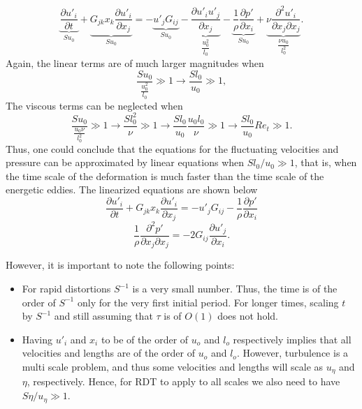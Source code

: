\documentclass[oneside,a4paper,11pt]{report}
\newcommand{\pfluc}{p'}
\newcommand{\ufluc}{u'}
\begin{document}
\begin{equation}
\underbrace{\frac{\partial \ufluc_i}{\partial t}}_{\displaystyle Su_0} + \underbrace{G_{jk} x_k \frac{\partial \ufluc_i}{\partial x_j}}_{ \displaystyle Su_0} = -\underbrace{\ufluc_j G_{ij}}_{\displaystyle S u_0} - \underbrace{\frac{\partial \ufluc_i \ufluc_j}{\partial x_j}}_{\dfrac{u_0^2}{l_0}} - \underbrace{\frac{1}{\rho} \frac{\partial \pfluc}{\partial x_i}}_{\displaystyle Su_0} + \underbrace{\nu \frac{\partial^2 \ufluc_i}{\partial x_j \partial x_j}}_{\dfrac{\nu u_0}{l_0^2}}. 
\end{equation}
Again, the linear terms are of much larger magnitudes when
\begin{equation}
\frac{Su_0}{\frac{u_0^2}{l_0}} \gg 1 \to \frac{Sl_0}{u_0} \gg 1,
\end{equation}
The viscous terms can be neglected when
\begin{equation}
\frac{Su_0}{\frac{u_0\nu}{l_0^2}} \gg 1 \to \frac{Sl_0^2}{\nu} \gg 1 \to \frac{Sl_0}{u_0}\frac{u_0l_0}{\nu} \gg 1 \to \frac{Sl_0}{u_0} Re_t \gg 1.
\end{equation}
Thus, one could conclude that the equations for the fluctuating velocities and pressure can be approximated by linear equations when $Sl_0/u_0 \gg 1$, that is, when the time scale of the deformation is much faster than the time scale of the energetic eddies. The linearized equations are shown below
\begin{equation}
\label{ulin}
\frac{\partial \ufluc_i}{\partial t} + G_{jk}x_k \frac{\partial \ufluc_i}{\partial x_j} = - \ufluc_j G_{ij} -\frac{1}{\rho} \frac{\partial \pfluc}{\partial x_i}
\end{equation}
\begin{equation}
\frac{1}{\rho} \frac{\partial^2 \pfluc}{\partial x_j \partial x_j} = -2 G_{ij} \frac{\partial \ufluc_j}{\partial x_i}.
\label{plin}
\end{equation}

However, it is important to note the following points:
\begin{itemize}
\item For rapid distortions $S^{-1}$ is a very small number. Thus, the time is of the order of $S^{-1}$ only for the very first initial period. For longer times, scaling $t$ by $S^{-1}$ and still assuming that $\tau$ is of $O(1)$ does not hold.
\item Having $\ufluc_i$ and $x_i$ to be of the order of $u_o$ and $l_o$ respectively implies that all velocities and lengths are of the order of $u_o$ and $l_o$. However, turbulence is a multi scale problem, and thus some velocities and lengths will scale as $u_\eta$ and $\eta$, respectively. Hence, for RDT to apply to all scales we also need to have $S\eta/u_\eta \gg 1$.
\end{itemize}
\end{document}
